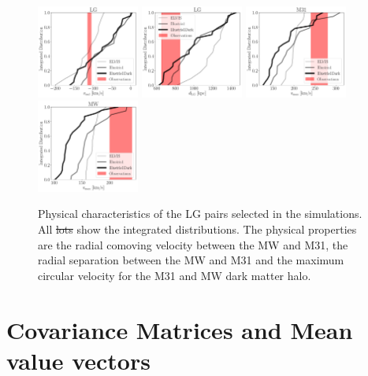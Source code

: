 \documentclass[a4paper,fleqn,usenatbib]{mnras}
\providecommand{\DIFaddtex}[1]{{\protect\color{blue}\uwave{#1}}} %
\providecommand{\DIFdeltex}[1]{{\protect\color{red}\sout{#1}}}                      %
\providecommand{\DIFdelbegin}{} %
\providecommand{\DIFaddFL}[1]{\DIFadd{#1}} %
\providecommand{\DIFdelFL}[1]{\DIFdel{#1}} %
\providecommand{\DIFaddbeginFL}{} %
\providecommand{\DIFaddendFL}{} %
\providecommand{\DIFdelbeginFL}{} %
\providecommand{\DIFdelendFL}{} %
\providecommand{\DIFadd}[1]{\texorpdfstring{\DIFaddtex{#1}}{#1}} %
\providecommand{\DIFdel}[1]{\texorpdfstring{\DIFdeltex{#1}}{}} %
\newcommand{\DIFscaledelfig}{0.5}
\newlength{\DIFdelgraphicswidth} %
\newlength{\DIFdelgraphicsheight} %
\newcommand{\DIFaddincludegraphics}[2][]{{\color{blue}\fbox{\DIFOincludegraphics[#1]{#2}}}} %
\newcommand{\DIFdelincludegraphics}[2][]{%
\sbox{\DIFdelgraphicsbox}{\DIFOincludegraphics[#1]{#2}}%
\settoboxwidth{\DIFdelgraphicswidth}{\DIFdelgraphicsbox} %
\settoboxtotalheight{\DIFdelgraphicsheight}{\DIFdelgraphicsbox} %
\scalebox{\DIFscaledelfig}{%
\parbox[b]{\DIFdelgraphicswidth}{\usebox{\DIFdelgraphicsbox}\\[-\baselineskip] \rule{\DIFdelgraphicswidth}{0em}}\llap{\resizebox{\DIFdelgraphicswidth}{\DIFdelgraphicsheight}{%
\setlength{\unitlength}{\DIFdelgraphicswidth}%
\begin{picture}(1,1)%
\thicklines\linethickness{2pt} %
{\color[rgb]{1,0,0}\put(0,0){\framebox(1,1){}}}%
{\color[rgb]{1,0,0}\put(0,0){\line( 1,1){1}}}%
{\color[rgb]{1,0,0}\put(0,1){\line(1,-1){1}}}%
\end{picture}%
}\hspace*{3pt}}} %
} %
\DeclareRobustCommand{\DIFdelbegin}{\DIFOdelbegin \let\includegraphics\DIFdelincludegraphics} %
\DeclareRobustCommand{\DIFaddbeginFL}{\DIFOaddbeginFL \let\includegraphics\DIFaddincludegraphics} %
\DeclareRobustCommand{\DIFaddendFL}{\DIFOaddendFL \let\includegraphics\DIFOincludegraphics} %
\DeclareRobustCommand{\DIFdelbeginFL}{\DIFOdelbeginFL \let\includegraphics\DIFdelincludegraphics} %
\DeclareRobustCommand{\DIFdelendFL}{\DIFOaddendFL \let\includegraphics\DIFOincludegraphics} %
\begin{document}
\begin{figure}
\centering
\includegraphics[width=0.30\textwidth]{int_distro_LG_v_rad.pdf}
\includegraphics[width=0.30\textwidth]{int_distro_LG_d.pdf}
\includegraphics[width=0.30\textwidth]{int_distro_M31_vmax.pdf}
\includegraphics[width=0.30\textwidth]{int_distro_MW_vmax.pdf}
\caption{Physical characteristics of the LG pairs selected in the
  simulations. All \DIFdelbeginFL \DIFdelFL{lots }\DIFdelendFL \DIFaddbeginFL \DIFaddFL{plots }\DIFaddendFL show the integrated distributions. The
  physical properties are the radial comoving velocity between the MW
  and M31, the radial separation between the MW and M31 and the
  maximum circular velocity for the M31 and MW dark matter halo.
\DIFdelbeginFL %
\DIFdelendFL \DIFaddbeginFL \label{fig:physical_pairs}\DIFaddendFL }
\end{figure}



\section{Covariance Matrices and Mean value vectors}
\DIFdelbegin %
\end{document}
